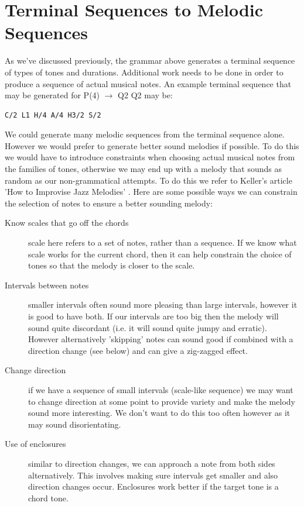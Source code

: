 \documentclass[pdftex,12pt,a4paper]{report}
\begin{document}
\section{Terminal Sequences to Melodic Sequences} \label{terminalsequences}
As we've discussed previously, the grammar above generates a terminal sequence of types of tones and durations. Additional work needs to be done in order to produce a sequence of actual musical notes. An example terminal sequence that may be generated for P(4) $\rightarrow$ Q2 Q2 may be:

\begin{verbatim}
C/2 L1 H/4 A/4 H3/2 S/2
\end{verbatim}

We could generate many melodic sequences from the terminal sequence alone. However we would prefer to generate better sound melodies if possible. To do this we would have to introduce constraints when choosing actual musical notes from the families of tones, otherwise we may end up with a melody that sounds as random as our non-grammatical attempts. To do this we refer to Keller's article 'How to Improvise Jazz Melodies' \cite{jazzkeller}. Here are some possible ways we can constrain the selection of notes to ensure a better sounding melody:

\begin{description}
  \item[Know scales that go off the chords] scale here refers to a set of notes, rather than a sequence. If we know what scale works for the current chord, then it can help constrain the choice of tones so that the melody is closer to the scale.
  \item[Intervals between notes] smaller intervals often sound more pleasing than large intervals, however it is good to have both. If our intervals are too big then the melody will sound quite discordant (i.e. it will sound quite jumpy and erratic). However alternatively 'skipping' notes can sound good if combined with a direction change (see below) and can give a zig-zagged effect.
  \item[Change direction] if we have a sequence of small intervals (scale-like sequence) we may want to change direction at some point to provide variety and make the melody sound more interesting. We don't want to do this too often however as it may sound disorientating.
  \item[Use of enclosures] similar to direction changes, we can approach a note from both sides alternatively. This involves making sure intervals get smaller and also direction changes occur. Enclosures work better if the target tone is a chord tone.
\end{description}
\end{document}
